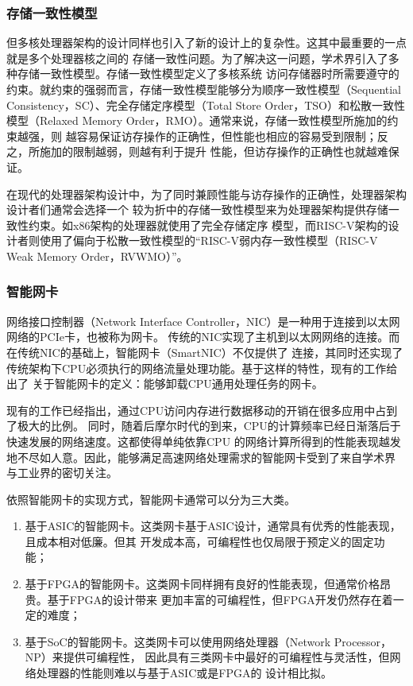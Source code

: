 \subsubsection{存储一致性模型}
\label{section:background_consistent_model}

但多核处理器架构的设计同样也引入了新的设计上的复杂性。这其中最重要的一点就是多个处理器核之间的
存储一致性问题。为了解决这一问题，学术界引入了多种存储一致性模型。存储一致性模型定义了多核系统
访问存储器时所需要遵守的约束。就约束的强弱而言，存储一致性模型能够分为顺序一致性模型（Sequential
Consistency，SC）、完全存储定序模型（Total Store Order，TSO）和松散一致性模型（Relaxed
Memory Order，RMO）\cite{sorin2011primer}。通常来说，存储一致性模型所施加的约束越强，则
越容易保证访存操作的正确性，但性能也相应的容易受到限制；反之，所施加的限制越弱，则越有利于提升
性能，但访存操作的正确性也就越难保证。

在现代的处理器架构设计中，为了同时兼顾性能与访存操作的正确性，处理器架构设计者们通常会选择一个
较为折中的存储一致性模型来为处理器架构提供存储一致性约束。如x86架构的处理器就使用了完全存储定序
模型，而RISC-V架构的设计者则使用了偏向于松散一致性模型的“RISC-V弱内存一致性模型（RISC-V Weak
Memory Order，RVWMO）”\cite{waterman2016design}。

\subsubsection{智能网卡}
\label{section:background_smartnic}

网络接口控制器（Network Interface Controller，NIC）是一种用于连接到以太网网络的PCIe卡，也被称为网卡。
传统的NIC实现了主机到以太网网络的连接。而在传统NIC的基础上，智能网卡（SmartNIC）不仅提供了
连接，其同时还实现了传统架构下CPU必须执行的网络流量处理功能。基于这样的特性，现有的工作给出了
关于智能网卡的定义：能够卸载CPU通用处理任务的网卡\cite{pcmag_smartnic,maxiaoxiao2022survey}。

现有的工作已经指出，通过CPU访问内存进行数据移动的开销在很多应用中占到了极大的比例\cite{maxiaoxiao2022survey}。
同时，随着后摩尔时代的到来，CPU的计算频率已经日渐落后于快速发展的网络速度。这都使得单纯依靠CPU
的网络计算所得到的性能表现越发地不尽如人意。因此，能够满足高速网络处理需求的智能网卡受到了来自学术界
与工业界的密切关注。

依照智能网卡的实现方式，智能网卡通常可以分为三大类\cite{bhalgat2021smartnic}。

\begin{enumerate}
  \item 基于ASIC的智能网卡。这类网卡基于ASIC设计，通常具有优秀的性能表现，且成本相对低廉。但其
        开发成本高，可编程性也仅局限于预定义的固定功能；
  \item 基于FPGA的智能网卡。这类网卡同样拥有良好的性能表现，但通常价格昂贵。基于FPGA的设计带来
        更加丰富的可编程性，但FPGA开发仍然存在着一定的难度；
  \item 基于SoC的智能网卡。这类网卡可以使用网络处理器（Network Processor，NP）来提供可编程性，
        因此具有三类网卡中最好的可编程性与灵活性，但网络处理器的性能则难以与基于ASIC或是FPGA的
        设计相比拟。
\end{enumerate}

